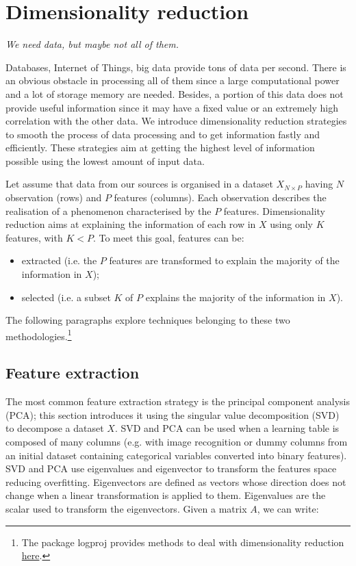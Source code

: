 \chapter{Dimensionality reduction}{}

\epigraph{\textit{We need data, but maybe not all of them.}}{}

Databases, Internet of Things, big data provide tons of data per second. There is an obvious obstacle in processing all of them since a large computational power and a lot of storage memory are needed. Besides, a portion of this data does not provide useful information since it may have a fixed value or an extremely high correlation with the other data. We introduce dimensionality reduction strategies to smooth the process of data processing and to get information fastly and efficiently. These strategies aim at getting the highest level of information possible using the lowest amount of input data.\par

Let assume that data from our sources is organised in a dataset $X_{N\times P}$ having $N$ observation (rows) and $P$ features (columns). Each observation describes the realisation of a phenomenon characterised by the $P$ features. Dimensionality reduction aims at explaining the information of each row in $X$ using only $K$ features, with $K<P$. To meet this goal, features can be:

\begin{itemize}
    \item extracted (i.e. the $P$ features are transformed to explain the majority of the information in $X$);
    \item selected (i.e. a subset $K$ of $P$ explains the majority of the information in $X$). 
\end{itemize}

The following paragraphs explore techniques belonging to these two methodologies.\footnote{The package logproj provides methods to deal with dimensionality reduction \href{https://github.com/aletuf93/logproj/blob/master/logproj/ml_dimensionalityReduction.py}{here}.} 

\section{Feature extraction}
The most common feature extraction strategy is the principal component analysis (PCA); this section introduces it using the singular value decomposition (SVD) to decompose a dataset $X$. SVD and PCA can be used when a learning table is composed of many columns (e.g. with image recognition or dummy columns from an initial dataset containing categorical variables converted into binary features). SVD and PCA use eigenvalues and eigenvector to transform the features space reducing overfitting. Eigenvectors are defined as vectors whose direction does not change when a linear transformation is applied to them. Eigenvalues are the scalar used to transform the eigenvectors. Given a matrix $A$, we can write:

